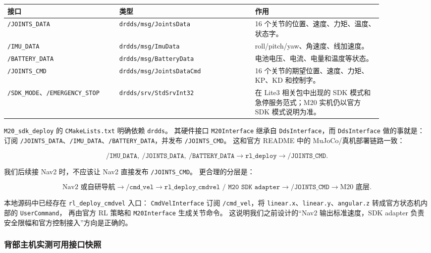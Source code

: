 \documentclass[UTF8,11pt,a4paper]{ctexart}
\begin{document}
\begin{center}
\renewcommand{\arraystretch}{1.2}
\begin{tabular}{p{0.26\linewidth}p{0.32\linewidth}p{0.30\linewidth}}
\toprule
\textbf{接口} & \textbf{类型} & \textbf{作用}\\
\midrule
\texttt{/JOINTS\_DATA} & \texttt{drdds/msg/JointsData} & 16 个关节的位置、速度、力矩、温度、状态字。\\
\texttt{/IMU\_DATA} & \texttt{drdds/msg/ImuData} & roll/pitch/yaw、角速度、线加速度。\\
\texttt{/BATTERY\_DATA} & \texttt{drdds/msg/BatteryData} & 电池电压、电流、电量和温度等状态。\\
\texttt{/JOINTS\_CMD} & \texttt{drdds/msg/JointsDataCmd} & 16 个关节的期望位置、速度、力矩、KP、KD 和控制字。\\
\texttt{/SDK\_MODE}、\texttt{/EMERGENCY\_STOP} & \texttt{drdds/srv/StdSrvInt32} & 在 Lite3 相关包中出现的 SDK 模式和急停服务范式；M20 实机仍以官方 SDK 模式说明为准。\\
\bottomrule
\end{tabular}
\end{center}

\texttt{M20\_sdk\_deploy} 的 \texttt{CMakeLists.txt} 明确依赖 \texttt{drdds}。
其硬件接口 \texttt{M20Interface} 继承自 \texttt{DdsInterface}，而 \texttt{DdsInterface} 做的事就是：
订阅 \texttt{/JOINTS\_DATA}、\texttt{/IMU\_DATA}、\texttt{/BATTERY\_DATA}，并发布 \texttt{/JOINTS\_CMD}。
这和官方 README 中的 MuJoCo/真机部署链路一致：

\[
\texttt{/IMU\_DATA},\ \texttt{/JOINTS\_DATA},\ \texttt{/BATTERY\_DATA}
\rightarrow
\texttt{rl\_deploy}
\rightarrow
\texttt{/JOINTS\_CMD}.
\]

我们后续接 Nav2 时，不应该让 Nav2 直接发布 \texttt{/JOINTS\_CMD}。
更合理的分层是：

\[
\text{Nav2 或自研导航}
\rightarrow
\texttt{/cmd\_vel}
\rightarrow
\texttt{rl\_deploy\_cmdvel / M20 SDK adapter}
\rightarrow
\texttt{/JOINTS\_CMD}
\rightarrow
\text{M20 底层}.
\]

本地源码中已经存在 \texttt{rl\_deploy\_cmdvel} 入口：
\texttt{CmdVelInterface} 订阅 \texttt{/cmd\_vel}，将 \texttt{linear.x}、\texttt{linear.y}、\texttt{angular.z} 转成官方状态机内部的 \texttt{UserCommand}，
再由官方 RL 策略和 \texttt{M20Interface} 生成关节命令。
这说明我们之前设计的“Nav2 输出标准速度，SDK adapter 负责安全限幅和官方控制接入”方向是正确的。

\subsubsection{背部主机实测可用接口快照}
\end{document}
